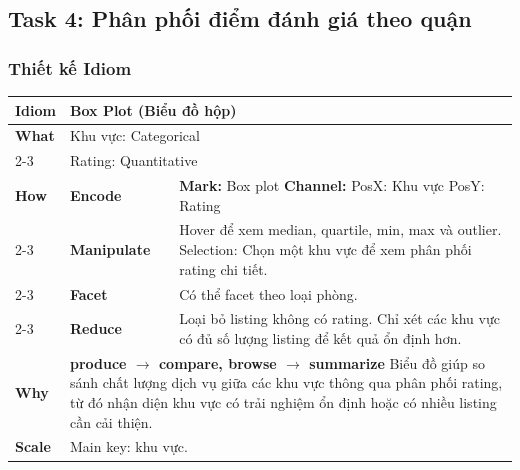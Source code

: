 \subsection{Task 4: Phân phối điểm đánh giá theo quận}

\subsubsection{Thiết kế Idiom}

\begin{table}[H]
\centering
\renewcommand{\arraystretch}{1.1}
\begin{tabularx}{\textwidth}{|l|l|X|}
\hline
\textbf{Idiom} & \multicolumn{2}{l|}{\textbf{Box Plot (Biểu đồ hộp)}} \\ \hline
\textbf{What}
& \multicolumn{2}{X|}{Khu vực: Categorical} \\ \cline{2-3}
& \multicolumn{2}{X|}{Rating: Quantitative} \\ \hline
\textbf{How}
& \textbf{Encode} &
\textbf{Mark:} Box plot \newline
\textbf{Channel:} \newline
\hspace*{1em} PosX: Khu vực \newline
\hspace*{1em} PosY: Rating \\ \cline{2-3}
& \textbf{Manipulate} &
Hover để xem median, quartile, min, max và outlier. \newline
Selection: Chọn một khu vực để xem phân phối rating chi tiết. \\ \cline{2-3}
& \textbf{Facet} &
Có thể facet theo loại phòng. \\ \cline{2-3}
& \textbf{Reduce} &
Loại bỏ listing không có rating. \newline
Chỉ xét các khu vực có đủ số lượng listing để kết quả ổn định hơn. \\ \hline
\textbf{Why} & \multicolumn{2}{X|}{
\textbf{produce $\rightarrow$ compare, browse $\rightarrow$ summarize} \newline
Biểu đồ giúp so sánh chất lượng dịch vụ giữa các khu vực thông qua phân phối rating, từ đó nhận diện khu vực có trải nghiệm ổn định hoặc có nhiều listing cần cải thiện.
} \\ \hline
\textbf{Scale} & \multicolumn{2}{X|}{
Main key: khu vực.
} \\ \hline
\end{tabularx}
\end{table}

